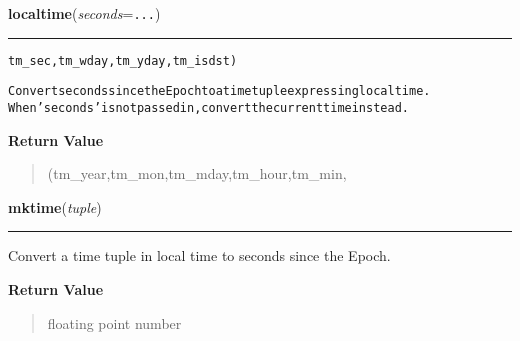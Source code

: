     \label{time:localtime}

    \vspace{0.5ex}

\hspace{.8\funcindent}\begin{boxedminipage}{\funcwidth}

    \raggedright \textbf{localtime}(\textit{seconds}={\tt ...})

    \vspace{-1.5ex}

    \rule{\textwidth}{0.5\fboxrule}
\setlength{\parskip}{2ex}
\begin{alltt}
                          tm\_sec,tm\_wday,tm\_yday,tm\_isdst)

Convert seconds since the Epoch to a time tuple expressing local time.
When 'seconds' is not passed in, convert the current time instead.
\end{alltt}

\setlength{\parskip}{1ex}
      \textbf{Return Value}
    \vspace{-1ex}

      \begin{quote}
      (tm\_year,tm\_mon,tm\_mday,tm\_hour,tm\_min,

      \end{quote}

    \end{boxedminipage}

    \label{time:mktime}

    \vspace{0.5ex}

\hspace{.8\funcindent}\begin{boxedminipage}{\funcwidth}

    \raggedright \textbf{mktime}(\textit{tuple})

    \vspace{-1.5ex}

    \rule{\textwidth}{0.5\fboxrule}
\setlength{\parskip}{2ex}
    Convert a time tuple in local time to seconds since the Epoch.

\setlength{\parskip}{1ex}
      \textbf{Return Value}
    \vspace{-1ex}

      \begin{quote}
      floating point number

      \end{quote}

    \end{boxedminipage}

